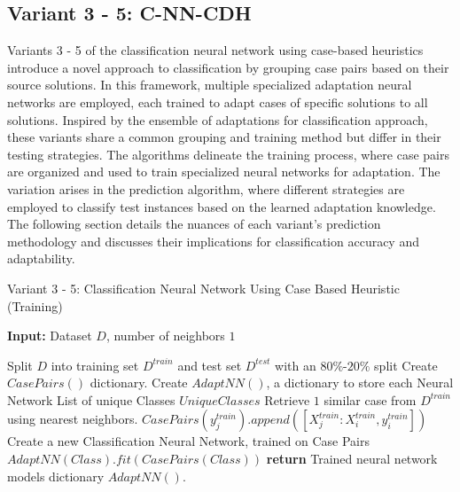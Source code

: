 \documentclass[a4paper, 12pt]{report}
\begin{document}
\subsection{Variant 3 - 5: C-NN-CDH}
Variants 3 - 5 of the classification neural network using case-based heuristics introduce a novel approach to classification by grouping case pairs based on their source solutions. 
In this framework, multiple specialized adaptation neural networks are employed, each trained to adapt cases of specific solutions to all solutions. 
Inspired by the ensemble of adaptations for classification approach, these variants share a common grouping and training method but differ in their testing strategies. 
The algorithms delineate the training process, where case pairs are organized and used to train specialized neural networks for adaptation. 
The variation arises in the prediction algorithm, where different strategies are employed to classify test instances based on the learned adaptation knowledge. 
The following section details the nuances of each variant's prediction methodology and discusses their implications for classification accuracy and adaptability.

\begin{algorithm}
    \caption{Variant 3 - 5: Classification Neural Network Using Case Based Heuristic (Training)}
    \label{alg:Classification_Varient3_5_using_CBH_train_alg19}

    \textbf{Input:} Dataset $D$, number of neighbors $1$
    \begin{algorithmic}
        \State Split $D$ into training set $D^{train}$ and test set $D^{test}$ with an $80\%$-$20\%$ split
        \State Create $CasePairs()$ dictionary.
        \State Create $AdaptNN()$, a dictionary to store each Neural Network
        \State List of unique Classes $UniqueClasses$
            \State Retrieve $1$ similar case from $D^{train}$ using nearest neighbors.
                \State $CasePairs(y^{train}_j).append([X^{train}_j:X^{train}_i, y^{train}_i])$
            \EndFor
        \EndFor
            \State Create a new Classification Neural Network, trained on Case Pairs
            \State $AdaptNN(Class).fit(CasePairs(Class))$
        \EndFor
        \State \textbf{return} Trained neural network models dictionary $AdaptNN()$.
    \end{algorithmic}
\end{algorithm}
\end{document}
